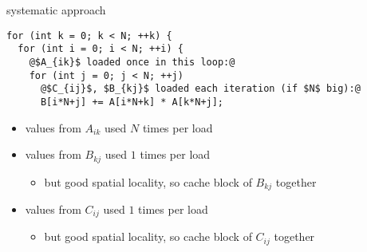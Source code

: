 \begin{frame}[fragile,label=cacheBlockMotivation2]{systematic approach}
\lstset{style=small,language=C,escapechar=@}
\begin{lstlisting}
for (int k = 0; k < N; ++k) {
  for (int i = 0; i < N; ++i) {
    @$A_{ik}$ loaded once in this loop:@
    for (int j = 0; j < N; ++j)
      @$C_{ij}$, $B_{kj}$ loaded each iteration (if $N$ big):@
      B[i*N+j] += A[i*N+k] * A[k*N+j];
\end{lstlisting}
\begin{itemize}
\item values from $A_{ik}$ used $N$ times per load
\item values from $B_{kj}$ used $1$ times per load
    \begin{itemize}
    \item but good spatial locality, so cache block of $B_{kj}$ together
    \end{itemize}
\item values from $C_{ij}$ used $1$ times per load
    \begin{itemize}
    \item but good spatial locality, so cache block of $C_{ij}$ together
    \end{itemize}
\end{itemize}
\end{frame}
